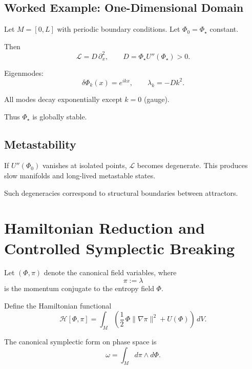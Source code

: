 \documentclass[11pt]{article}
\begin{document}
\subsection*{Worked Example: One-Dimensional Domain}

Let $M=[0,L]$ with periodic boundary conditions.
Let $\Phi_0 = \Phi_\star$ constant.

Then
\begin{equation}
\mathcal{L} = D\,\partial_x^2,
\qquad
D=\Phi_\star U''(\Phi_\star)>0.
\end{equation}

Eigenmodes:
\begin{equation}
\delta\Phi_k(x)=e^{ikx},
\qquad
\lambda_k = -Dk^2.
\end{equation}

All modes decay exponentially except $k=0$ (gauge).

Thus $\Phi_\star$ is globally stable.

\subsection*{Metastability}

If $U''(\Phi_0)$ vanishes at isolated points, $\mathcal{L}$ becomes degenerate.
This produces slow manifolds and long-lived metastable states.

Such degeneracies correspond to structural boundaries between attractors.

\section{Hamiltonian Reduction and Controlled Symplectic Breaking}

Let $(\Phi,\pi)$ denote the canonical field variables, where
\begin{equation}
\pi := \lambda
\end{equation}
is the momentum conjugate to the entropy field $\Phi$.

Define the Hamiltonian functional
\begin{equation}
\mathcal{H}[\Phi,\pi]
=
\int_M
\left(
\frac{1}{2}\,\Phi \lVert \nabla \pi \rVert^2
+
U(\Phi)
\right)\, dV.
\end{equation}

The canonical symplectic form on phase space is
\begin{equation}
\omega
=
\int_M d\pi \wedge d\Phi.
\end{equation}
\end{document}
